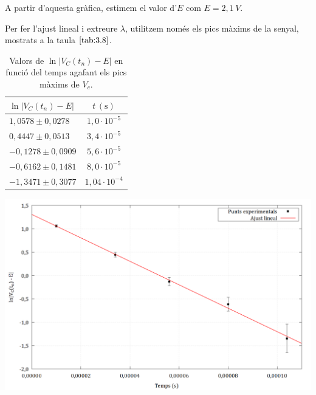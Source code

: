\documentclass[a4paper,10.5pt]{report}
\begin{document}
A partir d’aquesta gràfica, estimem el valor d’$E$ com $E = 2{,}1\,V $.


Per fer l’ajust lineal i extreure $\lambda$, utilitzem només els pics màxims de la senyal, mostrats a la taula $\ref{tab:3.8}$. 

\begin{table}[H]
	\centering
	\small
	\begin{minipage}{0.28\textwidth}
		\centering
		\caption{Valors de $\ln|V_C(t_n) - E|$ en funció del temps agafant els pics màxims de $V_c$.}
		\begin{tabular}{lc}
			\toprule
			$\ln{|V_C(t_n) - E|}$ & $t\,(\text{s})$ \\
			\midrule
			$1{,}0578 \pm 0{,}0278$ & $1{,}0 \cdot 10^{-5}$  \\
			$0{,}4447 \pm 0{,}0513$ & $3{,}4 \cdot 10^{-5}$  \\
			$-0{,}1278 \pm 0{,}0909$ & $5{,}6 \cdot 10^{-5}$  \\
			$-0{,}6162\pm 0{,}1481 $ & $8{,}0 \cdot 10^{-5}$ \\
			$-1{,}3471 \pm 0{,}3077$ & $1{,}04 \cdot 10^{-4}$ \\
			\bottomrule
		\end{tabular}
		\label{tab:3.8}
	\end{minipage}%
	\hfill
	\begin{minipage}{0.68\textwidth}
		\centering
		\includegraphics[width=\linewidth]{lambda.png} 
		\label{fig:3.7}
	\end{minipage}
\end{table}
\end{document}
